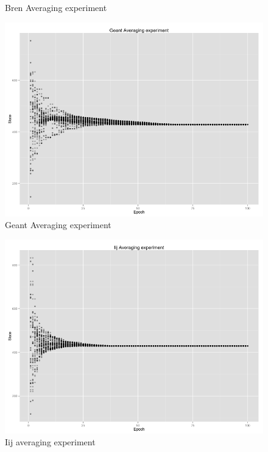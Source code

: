 \begin{figure}[h!]
\begin{minipage}[t]{0.47\textwidth}
    Bren Averaging experiment
    \end{minipage}
    \vspace{5ex}
    \begin{minipage}[t]{0.47\textwidth}
    \vspace{0pt}
    \includegraphics[width=\linewidth]{figures/Geant Averaging experiment.png}
    Geant Averaging experiment
    \end{minipage}
    \begin{minipage}[t]{0.47\textwidth}
    \vspace{0pt}
    \includegraphics[width=\linewidth]{figures/Iij averaging experiment.png}
    Iij averaging experiment
    \end{minipage}
    \caption{}
    \label{fig: result}
\end{figure}


